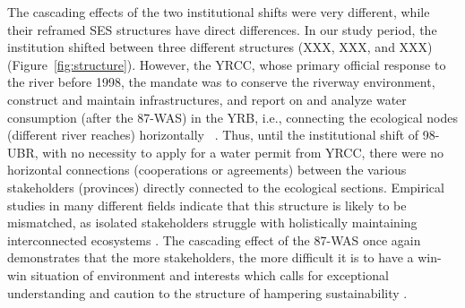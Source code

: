 The cascading effects of the two institutional shifts were very different, while their reframed SES structures have direct differences.
In our study period, the institution shifted between three different structures (XXX, XXX, and XXX) (Figure~\ref{fig:structure}).
However, the YRCC, whose primary official response to the river before 1998, the mandate was to conserve the riverway environment, construct and maintain infrastructures, and report on and analyze water consumption (after the 87-WAS) in the YRB, i.e., connecting the ecological nodes (different river reaches) horizontally ~\cite{wang2019a}.
Thus, until the institutional shift of 98-UBR, with no necessity to apply for a water permit from YRCC, there were no horizontal connections (cooperations or agreements) between the various stakeholders (provinces) directly connected to the ecological sections.
Empirical studies in many different fields indicate that this structure is likely to be mismatched, as isolated stakeholders struggle with holistically maintaining interconnected ecosystems
\cite{sayles2017,sayles2019,cai2016,bergsten2019}.
The cascading effect of the 87-WAS once again demonstrates that the more stakeholders, the more difficult it is to have a win-win situation of environment and interests \cite{hegwood2021} which calls for exceptional understanding and caution to the structure of hampering sustainability \cite{bergsten2019, sayles2019}.
